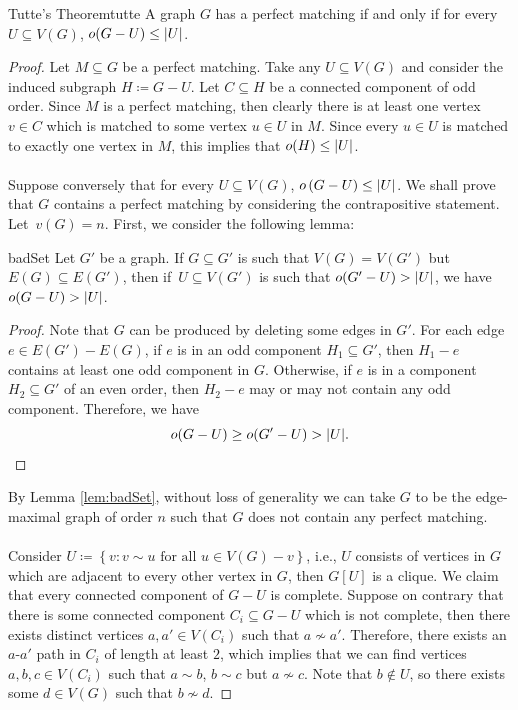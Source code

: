 \documentclass[math]{amznotes}
\theoremstyle{remark}
\newcommand{\0}{\mathbf{0}}
\newcommand{\1}{\mathbf{1}}
\begin{document}
\begin{thmbox}{Tutte's Theorem}{tutte}
    A graph $G$ has a perfect matching if and only if for every $U \subseteq V(G)$, $o(G - U) \leq {\left\lvert {U} \right\rvert}$.
    \tcblower
    \begin{proof}
        Let $M \subseteq G$ be a perfect matching. Take any $U \subseteq V(G)$ and consider the induced subgraph $H \coloneqq G - U$. Let $C \subseteq H$ be a connected component of odd order. Since $M$ is a perfect matching, then clearly there is at least one vertex $v \in C$ which is matched to some vertex $u \in U$ in $M$. Since every $u \in U$ is matched to exactly one vertex in $M$, this implies that $o(H) \leq {\left\lvert {U} \right\rvert}$.
        \\\\
        Suppose conversely that for every $U \subseteq V(G)$, $o\left(G - U\right) \leq {\left\lvert {U} \right\rvert}$. We shall prove that $G$ contains a perfect matching by considering the contrapositive statement. Let~$v(G) = n$. First, we consider the following lemma:
        \begin{lembox}{}{badSet}
            Let $G'$ be a  graph. If $G \subseteq G'$ is such that $V(G) = V(G')$ but $E(G) \subseteq E(G')$, then if~$U \subseteq V(G')$ is such that $o(G' - U) > {\left\lvert {U} \right\rvert}$, we have $o(G - U) > {\left\lvert {U} \right\rvert}$.
            \tcblower
            \begin{proof}
                Note that $G$ can be produced by deleting some edges in $G'$. For each edge~$e \in E(G') - E(G)$, if $e$ is in an odd component $H_1 \subseteq G'$, then $H_1 - e$ contains at least one odd component in $G$. Otherwise, if $e$ is in a component $H_2 \subseteq G'$ of an even order, then $H_2 - e$ may or may not contain any odd component. Therefore, we have
                \begin{equation*}
                    o(G - U) \geq o(G' - U) > {\left\lvert {U} \right\rvert}.
                \end{equation*}  
            \end{proof}
        \end{lembox}
        By Lemma \ref{lem:badSet}, without loss of generality we can take $G$ to be the edge-maximal graph of order $n$ such that $G$ does not contain any perfect matching. 
        \\\\
        Consider $U \coloneqq \left\{v \colon v \sim u \textrm{ for all } u \in V(G) - v\right\}$, i.e., $U$ consists of vertices in $G$ which are adjacent to every other vertex in $G$, then $G[U]$ is a clique. We claim that every connected component of $G - U$ is complete. Suppose on contrary that there is some connected component $C_i \subseteq G - U$ which is not complete, then there exists distinct vertices $a, a' \in V(C_i)$ such that $a \not\sim a'$. Therefore, there exists an $a$-$a'$ path in $C_i$ of length at least $2$, which implies that we can find vertices $a, b, c \in V(C_i)$ such that $a \sim b$, $b \sim c$ but $a \not\sim c$. Note that $b \notin U$, so there exists some $d \in V(G)$ such that $b \not\sim d$.

\end{proof}
\end{thmbox}
\end{document}
